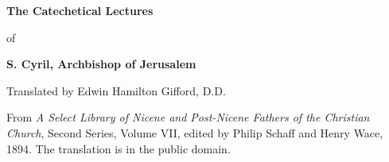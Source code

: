 \documentclass[11pt,letterpaper]{article}
\begin{document}
\color{ink}

\begin{titlepage}
\centering
\vspace*{4em}
{\LARGE\bfseries\color{heading} The Catechetical Lectures\par}
\vspace{1em}
{\large of\par}
\vspace{1em}
{\LARGE\bfseries\color{heading} S. Cyril, Archbishop of Jerusalem\par}
\vspace{3em}
{Translated by Edwin Hamilton Gifford, D.D.\par}
\vfill
{\small From \emph{A Select Library of Nicene and Post-Nicene Fathers of the
Christian Church}, Second Series, Volume VII, edited by Philip Schaff and
Henry Wace, 1894. The translation is in the public domain.\par}
\vspace{2em}
\end{titlepage}

\tableofcontents
\clearpage


\end{document}
